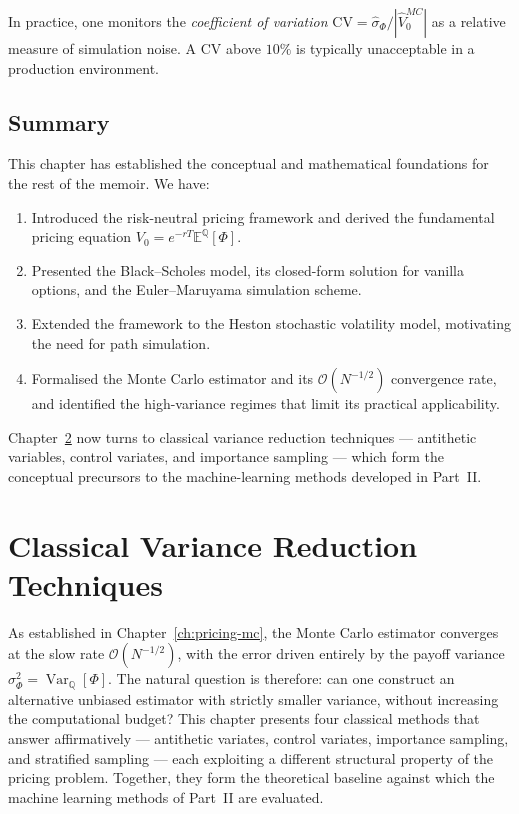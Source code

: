 \documentclass[12pt, a4paper]{report}
\theoremstyle{definition}
\newcommand{\EQ}{\mathbb{E}^{\mathbb{Q}}}
\newcommand{\Q}{\mathbb{Q}}
\newcommand{\Var}{\operatorname{Var}}
\begin{document}
In practice, one monitors the \emph{coefficient of variation}
$\mathrm{CV} = \hat{\sigma}_\Phi / |\hat{V}_0^{MC}|$ as a relative
measure of simulation noise.  A CV above $10\%$ is typically
unacceptable in a production environment.

\section{Summary}

This chapter has established the conceptual and mathematical foundations
for the rest of the memoir.  We have:

\begin{enumerate}
  \item Introduced the risk-neutral pricing framework and derived the
        fundamental pricing equation $V_0 = e^{-rT}\EQ[\Phi]$.
  \item Presented the Black--Scholes model, its closed-form solution for
        vanilla options, and the Euler--Maruyama simulation scheme.
  \item Extended the framework to the Heston stochastic volatility model,
        motivating the need for path simulation.
  \item Formalised the Monte Carlo estimator and its
        $\mathcal{O}(N^{-1/2})$ convergence rate, and identified the
        high-variance regimes that limit its practical applicability.
\end{enumerate}

Chapter~\ref{ch:variance-reduction} now turns to classical variance
reduction techniques --- antithetic variables, control variates, and
importance sampling --- which form the conceptual precursors to the
machine-learning methods developed in Part~II.

\chapter{Classical Variance Reduction Techniques}
\label{ch:variance-reduction}

As established in Chapter~\ref{ch:pricing-mc}, the Monte Carlo
estimator converges at the slow rate $\mathcal{O}(N^{-1/2})$, with
the error driven entirely by the payoff variance
$\sigma_\Phi^2 = \Var_{\Q}[\Phi]$.  The natural question is therefore:
can one construct an alternative unbiased estimator with strictly smaller
variance, without increasing the computational budget?  This chapter
presents four classical methods that answer affirmatively ---
antithetic variates, control variates, importance sampling, and
stratified sampling --- each exploiting a different structural property
of the pricing problem.  Together, they form the theoretical baseline
against which the machine learning methods of Part~II are evaluated.
\end{document}
